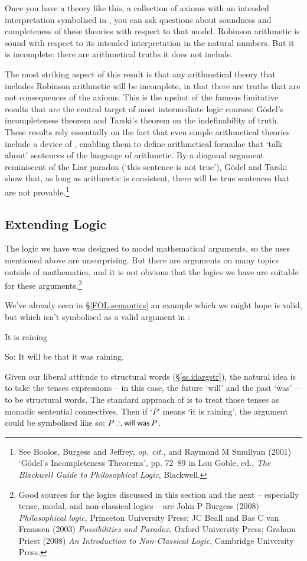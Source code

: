 Once you have a theory like this, a collection of axioms with an intended interpretation symbolised in \FOL, you can ask questions about soundness and completeness of these theories with respect to that model. Robinson arithmetic is sound with respect to its intended interpretation in the natural numbers. But it is incomplete: there are arithmetical truths it does not include. 

The most striking aspect of this result is that any arithmetical theory that includes Robinson arithmetic will be incomplete, in that there are truths that are not consequences of the axioms. This is the upshot of the famous limitative results that are the central target of most intermediate logic courses: Gödel's incompleteness theorem and Tarski's theorem on the indefinability of truth. These results rely essentially on the fact that even simple arithmetical theories include a device of , enabling them to define arithmetical formulae that `talk about' sentences of the language of arithmetic. By a diagonal argument reminiscent of the Liar paradox (`this sentence is not true'), Gödel and Tarski show that, as long as arithmetic is consistent, there will be true sentences that are not provable.\footnote{See Boolos, Burgess and Jeffrey, \emph{op. cit.}, and Raymond M Smullyan (2001) `Gödel’s Incompleteness Theorems', pp. 72–89 in Lou Goble, ed., \emph{The Blackwell Guide to Philosophical Logic}, Blackwell.} 

\subsection{Extending Logic}

The logic we have was designed to model mathematical arguments, so the uses mentioned above are unsurprising. But there are arguments on many topics outside of mathematics, and it is not obvious that the logics we have are suitable for these arguments.\footnote{Good sources for the logics discussed in this section and the next – especially tense, modal, and non-classical logics – are John P Burgess (2008) \emph{Philosophical logic}, Princeton University Press; JC Beall and Bas C van Fraassen (2003) \emph{Possibilities and Paradox}, Oxford University Press; Graham Priest (2008) \emph{An Introduction to Non-Classical Logic}, Cambridge University Press.}

We've already seen in §\ref{FOL.semantics} an example which we might hope is valid, but which isn't symbolised as a valid argument in \FOL: \begin{earg}
\item[] It is raining
\item[So:] It will be that it was raining.
\end{earg}
Given our liberal attitude to structural words (§\ref{ss.idargstr}), the natural idea is to take the tenses expressions – in this case, the future `will' and the past `was' – to be structural words. The standard approach of  is to treat those tenses as monadic sentential connectives. Then if `$P$' means `it is raining', the argument could be symbolised like so: $P \mathrel{\therefore} \mathop{\mathsf{will}}\mathop{\mathsf{was}}P$.

